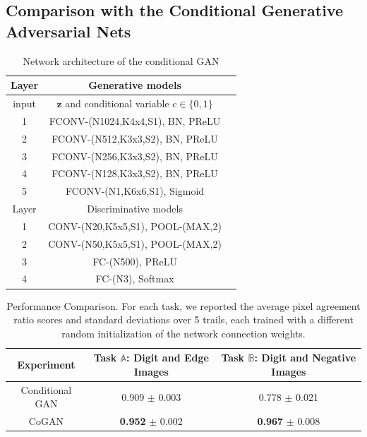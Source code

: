 
\subsection{Comparison with the Conditional Generative Adversarial Nets}\label{subsec::cgan}



\begin{table}[thb!]
\small
\centering
{
\caption{Network architecture of the conditional GAN}
\label{tbl::cgan}
\begin{tabular}{|c|c|c|}
\hline\rule{0pt}{2ex}    
Layer &  Generative models \\
\hline 
input &  $\mathbf{z}$ and conditional variable $c\in\{0,1\}$ \\
1 &  FCONV-(N1024,K4x4,S1), BN, PReLU \\
2 &  FCONV-(N512,K3x3,S2), BN, PReLU \\
3 &  FCONV-(N256,K3x3,S2), BN, PReLU \\
4 &  FCONV-(N128,K3x3,S2), BN, PReLU \\
5 &  FCONV-(N1,K6x6,S1), Sigmoid \\
\hline
\hline\rule{0pt}{2ex} 
Layer &  Discriminative models \\
\hline\rule{0pt}{2ex} 
1 & CONV-(N20,K5x5,S1), POOL-(MAX,2) \\
2 & CONV-(N50,K5x5,S1), POOL-(MAX,2) \\
3 & FC-(N500), PReLU \\
4 & FC-(N3), Softmax \\
\hline
\end{tabular}}
\end{table}

\begin{table}[thb!]
\centering
{ 
\caption{Performance Comparison. For each task, we reported the average pixel agreement ratio scores and standard deviations over 5 trails, each trained with a different random initialization of the network connection weights.}
\label{tbl::cgan_perf}
\begin{tabular}{|c|c|c|}
\hline
Experiment & Task $\mathbb{A}$: Digit and Edge Images & Task $\mathbb{B}$: Digit and Negative Images \\
\hline
Conditional GAN & 0.909 $\pm$ 0.003 & 0.778 $\pm$ 0.021\\
CoGAN & {\bf 0.952} $\pm$ 0.002 & {\bf 0.967} $\pm$ 0.008\\
\hline
\end{tabular}}
\end{table}

